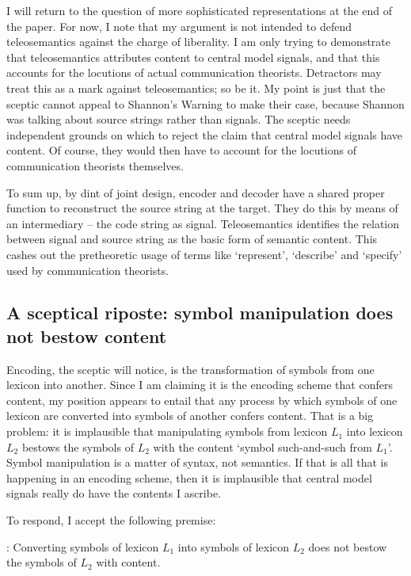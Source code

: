 \documentclass[12pt]{article}
\begin{document}
I will return to the question of more sophisticated representations at the end of the paper.
For now, I note that my argument is not intended to defend teleosemantics against the charge of liberality.
I am only trying to demonstrate that teleosemantics attributes content to central model signals, and that this accounts for the locutions of actual communication theorists.
Detractors may treat this as a mark against teleosemantics; so be it.
My point is just that the sceptic cannot appeal to {\sc Shannon's Warning} to make their case, because Shannon was talking about source strings rather than signals.
The sceptic needs independent grounds on which to reject the claim that central model signals have content.
Of course, they would then have to account for the locutions of communication theorists themselves.

To sum up, by dint of joint design, encoder and decoder have a shared proper function to reconstruct the source string at the target.
They do this by means of an intermediary -- the code string as signal.
Teleosemantics identifies the relation between signal and source string as the basic form of semantic content.
This cashes out the pretheoretic usage of terms like `represent', `describe' and `specify' used by communication theorists.

\subsection{A sceptical riposte: symbol manipulation does not bestow content}

Encoding, the sceptic will notice, is the transformation of symbols from one lexicon into another.
Since I am claiming it is the encoding scheme that confers content, my position appears to entail that any process by which symbols of one lexicon are converted into symbols of another confers content.
That is a big problem: it is implausible that manipulating symbols from lexicon $L_1$ into lexicon $L_2$ bestows the symbols of $L_2$ with the content `symbol such-and-such from $L_1$'.
Symbol manipulation is a matter of syntax, not semantics.
If that is all that is happening in an encoding scheme, then it is implausible that central model signals really do have the contents I ascribe.

To respond, I accept the following premise:

\begin{myquote}
\smi{}: Converting symbols of lexicon $L_1$ into symbols of lexicon $L_2$ does not bestow the symbols of $L_2$ with content.
\end{myquote}
\end{document}
